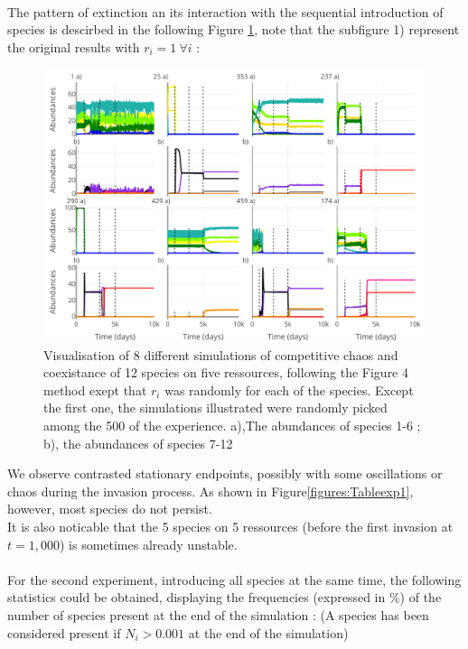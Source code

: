 \\
The pattern of extinction an its interaction with the sequential introduction of 
species is descirbed in the following Figure \ref{figures:Figexp1}, note that 
the subfigure 1) represent the original results with $r_i=1 ~\forall i$ : 
\begin{figure}[H]
\begin{center} 
 \includegraphics[width=1\textwidth]{../Code/Figures/Figure_exp1.pdf}
  \caption{Visualisation of 8 different simulations of competitive chaos and 
coexistance of 12 species on five ressources, following the Figure 4 method 
exept that $r_i$ was randomly for each of the species. Except the first one, the 
simulations illustrated were randomly picked among the 500 of the experience. 
a),The abundances of species 1-6 ; b), the abundances of species 7-12}
  \label{figures:Figexp1}
\end{center}
\end{figure}
We observe contrasted stationary endpoints, possibly with some oscillations or 
chaos during the invasion process. As shown in Figure\ref{figures:Tableexp1}, 
however, most species do not persist.\\
It is also noticable that the 5 species on 5 ressources (before the first 
invasion at $t=1,000$) is sometimes already unstable.\\
\\
For the second experiment, introducing all species at the same time, the 
following statistics could be obtained, displaying the frequencies (expressed in 
\%) of the number of species present at the end of the simulation : (A species 
has been considered present if $N_i > 0.001$ at the end of the simulation) \\
